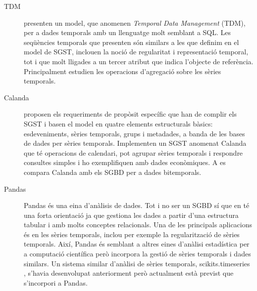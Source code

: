 \begin{description}


\item[TDM] \textcite{segev87:sigmod} presenten un model, que anomenen
  \emph{Temporal Data Management} (TDM), per a dades temporals amb un
  llenguatge molt semblant a \gls{SQL}. Les seqüències temporals que
  presenten són similars a les que definim en el model de
  \gls{SGST}, inclouen la noció de regularitat i representació
  temporal, tot i que molt lligades a un tercer atribut que indica
  l'objecte de referència. Principalment estudien les operacions
  d'agregació sobre les sèries temporals.


\item[Calanda] \textcite{dreyer94} proposen els requeriments de
  propòsit específic que han de complir els \gls{SGST} i basen el
  model en quatre elements estructurals bàsics: esdeveniments, sèries
  temporals, grups i metadades, a banda de les bases de dades per
  sèries temporals. Implementen un \gls{SGST} anomenat
  Calanda \parencite{dreyer94b,dreyer95,dreyer95b} que té operacions
  de calendari, pot agrupar sèries temporals i respondre consultes
  simples i ho exemplifiquen amb dades econòmiques. A \cite{schmidt95}
  es compara Calanda amb els \gls{SGBD} per a dades bitemporals.




\item[Pandas] Pandas \parencite{pandas} és una eina d'anàlisis de
  dades. Tot i no ser un \gls{SGBD} sí que en té una forta orientació
  ja que gestiona les dades a partir d'una estructura tabular i amb
  molts conceptes relacionals.  Una de les principals aplicacions és
  en les sèries temporals, inclou per exemple la regularització de
  sèries temporals. Així, Pandas és semblant a altres eines d'anàlisi
  estadística per a computació científica però incorpora la gestió de
  sèries temporals i dades similars. Un sistema similar d'anàlisi de
  sèries temporals, scikits.timeseries \parencite{pytseries}, s'havia
  desenvolupat anteriorment però actualment està previst que
  s'incorpori a Pandas.



\end{description}







